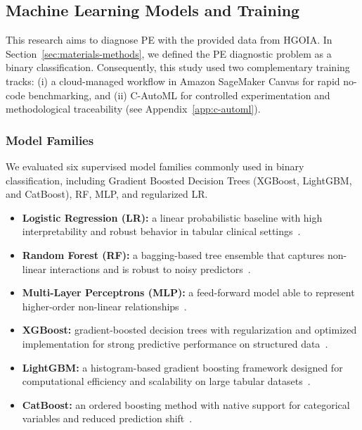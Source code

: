\documentclass[diagnostics,article,submit,pdftex,moreauthors]{Definitions/mdpi}
\begin{document}
\subsection{Machine Learning Models and Training}
\label{sec:mach-learn-models}
This research aims to diagnose \ac{PE} with the provided data
from \ac{HGOIA}. In Section~\ref{sec:materials-methods}, we
defined the \ac{PE} diagnostic problem as a binary
classification. Consequently, this study used two complementary
training tracks: (i) a cloud-managed workflow in Amazon SageMaker Canvas
for rapid no-code benchmarking, and (ii) \ac{C-AutoML} for controlled
experimentation and methodological traceability (see
Appendix~\ref{app:c-automl}). 

\subsubsection{Model Families}
\label{sec:model-families}

We evaluated six supervised model families commonly used in binary
classification, including Gradient Boosted Decision Trees (XGBoost,
LightGBM, and CatBoost), \ac{RF}, \ac{MLP}, and regularized
\ac{LR}.

\begin{itemize}
\item \textbf{Logistic Regression (LR):} a linear probabilistic
  baseline with high interpretability and robust behavior in
  tabular clinical settings~\cite{cox1958logistic}.
\item \textbf{Random Forest (RF):} a bagging-based tree ensemble that
  captures non-linear interactions and is robust to noisy
  predictors~\cite{breiman2001randomforest}.
\item \textbf{Multi-Layer Perceptrons (MLP):} a feed-forward
  model able to represent higher-order non-linear
  relationships~\cite{rumelhart1986backprop}.
\item \textbf{XGBoost:} gradient-boosted decision trees with
  regularization and optimized implementation for strong predictive
  performance on structured data~\cite{chen2016xgboost}.
\item \textbf{LightGBM:} a histogram-based gradient boosting framework
  designed for computational efficiency and scalability on large
  tabular datasets~\cite{ke2017lightgbm}.
\item \textbf{CatBoost:} an ordered boosting method with native support
  for categorical variables and reduced prediction
  shift~\cite{prokhorenkova2018catboost}.
\end{itemize}
\end{document}
